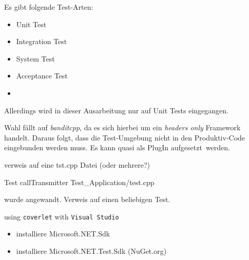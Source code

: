 


Es gibt folgende Test-Arten:
\begin{itemize}
\item Unit Test
\item Integration Test
\item System Test
\item Acceptance Test
\item {}
\end{itemize}


Allerdings wird in dieser Ausarbeitung nur auf Unit Tests eingegangen.












Wahl fällt auf \textit{banditcpp}, da es sich hierbei um ein \textit{headers only} Framework handelt.
Daraus folgt, dass die Test-Umgebung nicht in den Produktiv-Code eingebunden werden muss. Es kann quasi als PlugIn \glqq aufgesetzt\grqq\ werden.




verweis auf eine tst.cpp Datei (oder mehrere?)



Test callTransmitter Test\_Application/test.cpp




wurde angewandt. Verweis auf einen beliebigen Test.









using \texttt{coverlet} with \texttt{Visual Studio}



\begin{itemize}
\item installiere Microsoft.NET.Sdk
\item installiere Microsoft.NET.Test.Sdk (NuGet.org)



\end{itemize}


